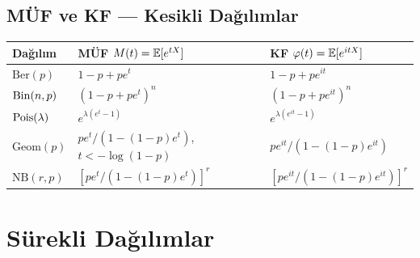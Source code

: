 \subsection{MÜF ve KF --- Kesikli Dağılımlar}

\begin{center}
\renewcommand{\arraystretch}{1.5}
\small
\begin{tabular}{p{2.4cm}p{4.5cm}p{4.5cm}}
\hline
\textbf{Dağılım} & \textbf{MÜF} $M(t)=\mathbb{E}[e^{tX}]$ & \textbf{KF} $\varphi(t)=\mathbb{E}[e^{itX}]$ \\
\hline
$\mathrm{Ber}(p)$ & $1-p+pe^t$ & $1-p+pe^{it}$ \\
$\operatorname{Bin}(n,p)$ & $(1-p+pe^t)^n$ & $(1-p+pe^{it})^n$ \\
$\operatorname{Pois}(\lambda)$ & $e^{\lambda(e^t-1)}$ & $e^{\lambda(e^{it}-1)}$ \\
$\mathrm{Geom}(p)$ & $pe^t/(1-(1-p)e^t)$, $t<-\log(1-p)$ & $pe^{it}/(1-(1-p)e^{it})$ \\
$\mathrm{NB}(r,p)$ & $[pe^t/(1-(1-p)e^t)]^r$ & $[pe^{it}/(1-(1-p)e^{it})]^r$ \\
\hline
\end{tabular}
\end{center}

\section{Sürekli Dağılımlar}
\label{app:surekli_dag}

